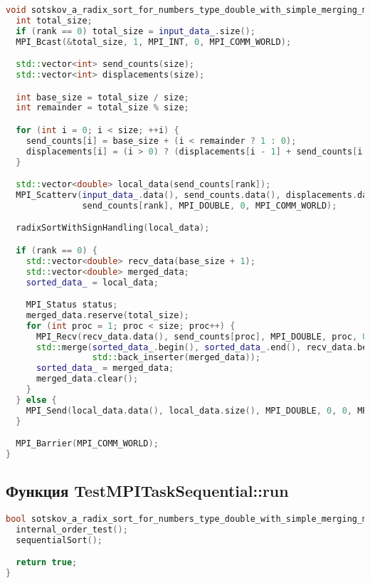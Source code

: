 \documentclass[12pt]{article}
\begin{document}
\begin{lstlisting}[language=C++]
void sotskov_a_radix_sort_for_numbers_type_double_with_simple_merging_mpi::TestMPITaskParallel::parallelSort() {
  int total_size;
  if (rank == 0) total_size = input_data_.size();
  MPI_Bcast(&total_size, 1, MPI_INT, 0, MPI_COMM_WORLD);

  std::vector<int> send_counts(size);
  std::vector<int> displacements(size);

  int base_size = total_size / size;
  int remainder = total_size % size;

  for (int i = 0; i < size; ++i) {
    send_counts[i] = base_size + (i < remainder ? 1 : 0);
    displacements[i] = (i > 0) ? (displacements[i - 1] + send_counts[i - 1]) : 0;
  }

  std::vector<double> local_data(send_counts[rank]);
  MPI_Scatterv(input_data_.data(), send_counts.data(), displacements.data(), MPI_DOUBLE, local_data.data(),
               send_counts[rank], MPI_DOUBLE, 0, MPI_COMM_WORLD);

  radixSortWithSignHandling(local_data);

  if (rank == 0) {
    std::vector<double> recv_data(base_size + 1);
    std::vector<double> merged_data;
    sorted_data_ = local_data;

    MPI_Status status;
    merged_data.reserve(total_size);
    for (int proc = 1; proc < size; proc++) {
      MPI_Recv(recv_data.data(), send_counts[proc], MPI_DOUBLE, proc, 0, MPI_COMM_WORLD, &status);
      std::merge(sorted_data_.begin(), sorted_data_.end(), recv_data.begin(), recv_data.begin() + send_counts[proc],
                 std::back_inserter(merged_data));
      sorted_data_ = merged_data;
      merged_data.clear();
    }
  } else {
    MPI_Send(local_data.data(), local_data.size(), MPI_DOUBLE, 0, 0, MPI_COMM_WORLD);
  }

  MPI_Barrier(MPI_COMM_WORLD);
}
\end{lstlisting}

\clearpage
\subsection*{Функция TestMPITaskSequential::run}

\begin{lstlisting}[language=C++]
bool sotskov_a_radix_sort_for_numbers_type_double_with_simple_merging_mpi::TestMPITaskSequential::run() {
  internal_order_test();
  sequentialSort();

  return true;
}
\end{lstlisting}
\end{document}
